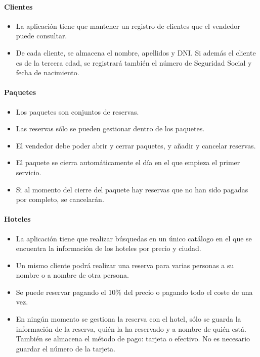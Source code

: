 \documentclass[12pt,a4paper,titlepage]{article}
\begin{document}
\paragraph{Clientes}
\begin{itemize}
\item La aplicación tiene que mantener un registro de clientes que el vendedor puede consultar.
\item De cada cliente, se almacena el nombre, apellidos y DNI. Si además el cliente es de la tercera edad, se registrará también el número de Seguridad Social y fecha de nacimiento.
\end{itemize}

\paragraph{Paquetes}
\begin{itemize}
\item Los paquetes son conjuntos de reservas.
\item Las reservas sólo se pueden gestionar dentro de los paquetes.
\item El vendedor debe poder abrir y cerrar paquetes, y añadir y cancelar reservas.
\item El paquete se cierra automáticamente el día en el que empieza el primer servicio.
\item Si al momento del cierre del paquete hay reservas que no han sido pagadas por completo, se cancelarán.
\end{itemize}


\paragraph{Hoteles}

\begin{itemize}
\item La aplicación tiene que realizar búsquedas en un único catálogo en el que se encuentra la información de los hoteles por precio y ciudad. 
\item Un mismo cliente podrá realizar una reserva para varias personas a su nombre o a nombre de otra persona.
\item Se puede reservar pagando el 10\% del precio o pagando todo el coste de una vez.
\item En ningún momento se gestiona la reserva con el hotel, sólo se guarda la información de la reserva, quién la ha reservado y a nombre de quién está. También se almacena el método de pago: tarjeta o efectivo. No es necesario guardar el número de la tarjeta.
\end{itemize}
\end{document}
